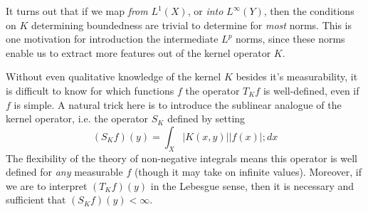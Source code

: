 It turns out that if we map \emph{from} $L^1(X)$, or \emph{into} $L^\infty(Y)$, then the conditions on $K$ determining boundedness are trivial to determine for \emph{most} norms. This is one motivation for introduction the intermediate $L^p$ norms, since these norms enable us to extract more features out of the kernel operator $K$.

Without even qualitative knowledge of the kernel $K$ besides it's measurability, it is difficult to know for which functions $f$ the operator $T_K f$ is well-defined, even if $f$ is simple. A natural trick here is to introduce the sublinear analogue of the kernel operator, i.e. the operator $S_K$ defined by setting
%
\[ (S_K f)(y) = \int_X |K(x,y)| |f(x)|; dx \]
%
The flexibility of the theory of non-negative integrals means this operator is well defined for \emph{any} measurable $f$ (though it may take on infinite values). Moreover, if we are to interpret $(T_K f)(y)$ in the Lebesgue sense, then it is necessary and sufficient that $(S_K f)(y) < \infty$.

